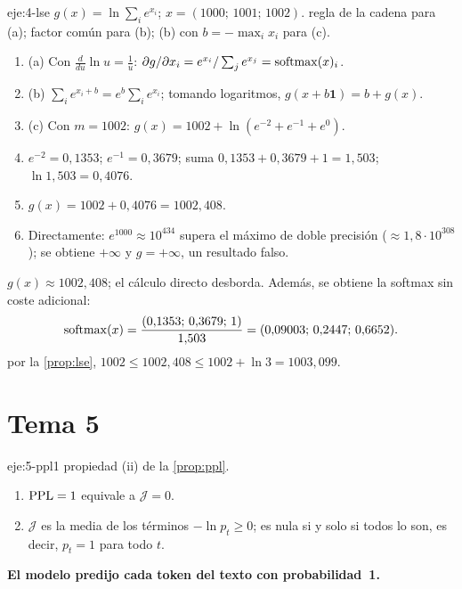 \begin{solucion}{eje:4-lse}
\datos $g(x)=\ln\sum_i e^{x_i}$; $x=(1000;\,1001;\,1002)$.
\planteamiento regla de la cadena para (a); factor común para (b); (b) con $b=-\max_i x_i$ para (c).
\pasos
\begin{enumerate}[label=\arabic*.]
  \item (a) Con $\frac{d}{du}\ln u=\frac1u$: $\partial g/\partial x_i=e^{x_i}/\sum_j e^{x_j}=\operatorname{softmax}(x)_i$.
  \item (b) $\sum_i e^{x_i+b}=e^{b}\sum_i e^{x_i}$; tomando logaritmos, $g(x+b\mathbf 1)=b+g(x)$.
  \item (c) Con $m=1002$: $g(x)=1002+\ln(e^{-2}+e^{-1}+e^{0})$.
  \item $e^{-2}=0{,}1353$; $e^{-1}=0{,}3679$; suma $0{,}1353+0{,}3679+1=1{,}503$; $\ln 1{,}503=0{,}4076$.
  \item $g(x)=1002+0{,}4076=1002{,}408$.
  \item Directamente: $e^{1000}\approx 10^{434}$ supera el máximo de doble precisión ($\approx 1{,}8\cdot 10^{308}$); se obtiene $+\infty$ y $g=+\infty$, un resultado falso.
\end{enumerate}
\resultado \textbf{$g(x)\approx 1002{,}408$}; el cálculo directo desborda. Además, se obtiene la softmax sin coste adicional:
\[\operatorname{softmax}(x)=\frac{(0{,}1353;\,0{,}3679;\,1)}{1{,}503}=(0{,}09003;\,0{,}2447;\,0{,}6652).\]
\comprobacion por la \cref{prop:lse}, $1002\le 1002{,}408\le 1002+\ln 3=1003{,}099$.
\end{solucion}

\section{Tema 5}

\begin{solucion}{eje:5-ppl1}
\planteamiento propiedad (ii) de la \cref{prop:ppl}.
\pasos
\begin{enumerate}[label=\arabic*.]
  \item $\operatorname{PPL}=1$ equivale a $\mathcal J=0$.
  \item $\mathcal J$ es la media de los términos $-\ln p_t\ge 0$; es nula si y solo si todos lo son, es decir, $p_t=1$ para todo $t$.
\end{enumerate}
\resultado \textbf{El modelo predijo cada token del texto con probabilidad~1.}
\end{solucion}

